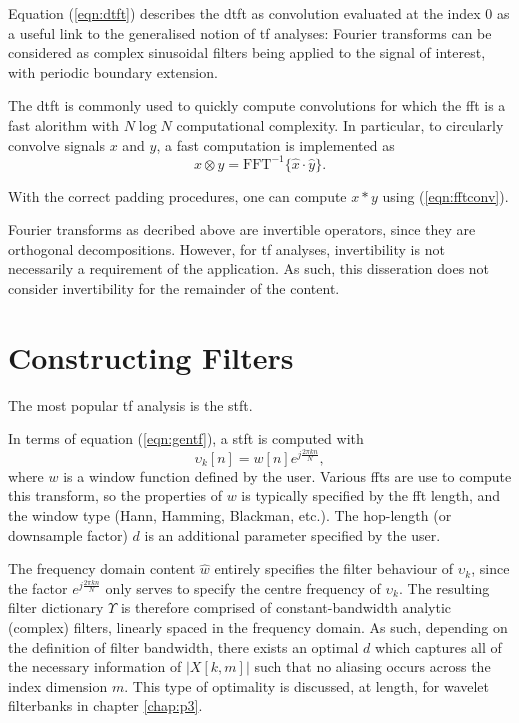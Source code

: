 Equation (\ref{eqn:dtft}) describes the \ac{dtft} as convolution evaluated at the index 0 as a useful link to the generalised notion of \ac{tf} analyses: Fourier transforms can be considered as complex sinusoidal filters being applied to the signal of interest, with periodic boundary extension.

The \ac{dtft} is commonly used to quickly compute convolutions for which the \ac{fft} is a fast alorithm with $N \log N$ computational complexity. In particular, to circularly convolve signals $x$ and $y$, a fast computation is implemented as
\begin{equation}
    \label{eqn:fftconv}
    x \otimes y = \text{FFT}^{-1}\{\hat{x} \cdot \hat{y}\}.
\end{equation}

With the correct padding procedures, one can compute $x * y$ using (\ref{eqn:fftconv}).

Fourier transforms as decribed above are invertible operators, since they are orthogonal decompositions. However, for \ac{tf} analyses, invertibility is not necessarily a requirement of the application. As such, this disseration does not consider invertibility for the remainder of the content.


\section{Constructing Filters}
\label{sec:p1i:tfa}

The most popular \ac{tf} analysis is the \ac{stft}.

In terms of equation (\ref{eqn:gentf}), a \ac{stft} is computed with 
\begin{equation}
    \label{eqn:stftfilter}
    \upsilon_k[n] =  w[n] e^{j \frac{2\pi k n}{N}},
\end{equation}
where $w$ is a window function defined by the user. Various \acp{fft} are use to compute this transform, so the properties of $w$ is typically specified by the \ac{fft} length, and the window type (Hann, Hamming, Blackman, etc.). The hop-length (or downsample factor) $d$ is an additional parameter specified by the user.

The frequency domain content $\hat{w}$ entirely specifies the filter behaviour of $\upsilon_k$, since the factor $e^{j \frac{2\pi k n}{N}}$ only serves to specify the centre frequency of $\upsilon_k$. The resulting filter dictionary $\Upsilon$ is therefore comprised of constant-bandwidth analytic (complex) filters, linearly spaced in the frequency domain. As such, depending on the definition of filter bandwidth, there exists an optimal $d$ which captures all of the necessary information of $|X[k, m]|$ such that no aliasing occurs across the index dimension $m$. This type of optimality is discussed, at length, for wavelet filterbanks in chapter \ref{chap:p3}.

